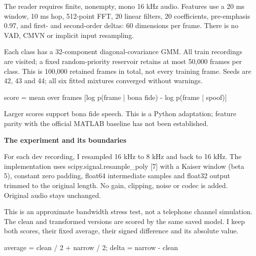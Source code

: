 \documentclass[10pt,a4paper]{article}
\newcommand{\reporttitle}[1]{{\color{navy}\Large\bfseries #1}\par\vspace{5pt}}
\begin{document}
\par

The reader requires finite, nonempty, mono 16 kHz audio. Features use a 20 ms window, 10 ms hop, 512-point FFT, 20 linear filters, 20 coefficients, pre-emphasis 0.97, and first- and second-order deltas: 60 dimensions per frame. There is no VAD, CMVN or implicit input resampling.\par

Each class has a 32-component diagonal-covariance GMM. All train recordings are visited; a fixed random-priority reservoir retains at most 50,000 frames per class. This is 100,000 retained frames in total, not every training frame. Seeds are 42, 43 and 44; all six fitted mixtures converged without warnings.\par

{\small\ttfamily score = mean over frames [log p(frame | bona fide) - log p(frame | spoof)]}\par

{\small Larger scores support bona fide speech. This is a Python adaptation; feature parity with the official MATLAB baseline has not been established.}\par

\clearpage

\reporttitle{The experiment and its boundaries}

\par

For each dev recording, I resampled 16 kHz to 8 kHz and back to 16 kHz. The implementation uses scipy.signal.resample\_poly [7] with a Kaiser window (beta 5), constant zero padding, float64 intermediate samples and float32 output trimmed to the original length. No gain, clipping, noise or codec is added. Original audio stays unchanged.\par

This is an approximate bandwidth stress test, not a telephone channel simulation. The clean and transformed versions are scored by the same saved model. I keep both scores, their fixed average, their signed difference and its absolute value.\par

{\small\ttfamily average = clean / 2 + narrow / 2;  delta = narrow - clean}\par

\par
\end{document}
